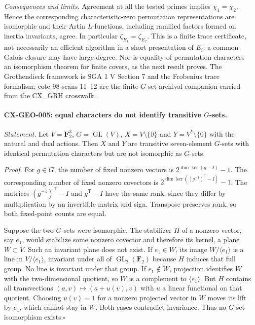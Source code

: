 \documentclass[11pt,a4paper]{article}
\begin{document}
\emph{Consequences and limits.} Agreement at all the tested primes implies
$\chi_1=\chi_2$. Hence the corresponding characteristic-zero permutation
representations are isomorphic and their Artin $L$-functions, including
ramified factors formed on inertia invariants, agree. In particular
$\zeta_{E_1}=\zeta_{E_2}$. This is a finite trace certificate, not necessarily
an efficient algorithm in a short presentation of $E_i$: a common Galois
closure may have large degree. Nor is equality of permutation characters
an isomorphism theorem for finite covers, as the next result proves.
The Grothendieck framework is SGA 1 V Section 7 and the Frobenius trace
formalism; cote 98 scans 11--12 are the finite-$G$-set archival companion
carried from the CX\_GRH crosswalk.

\paragraph{CX-GEO-005: equal characters do not identify transitive $G$-sets.}
\emph{Statement.} Let $V=\mathbf F_2^3$, $G=\operatorname{GL}(V)$,
$X=V\setminus\{0\}$ and $Y=V^*\setminus\{0\}$ with the natural and dual
actions. Then $X$ and $Y$ are transitive seven-element $G$-sets with identical
permutation characters but are not isomorphic as $G$-sets.

\emph{Proof.} For $g\in G$, the number of fixed nonzero vectors is
$2^{\dim\ker(g-I)}-1$. The corresponding number of fixed nonzero covectors
is $2^{\dim\ker((g^{-1})^{\mathsf T}-I)}-1$. The matrices
$(g^{-1})^{\mathsf T}-I$ and $g^{\mathsf T}-I$ have the same rank, since
they differ by multiplication by an invertible matrix and sign. Transpose
preserves rank, so both fixed-point counts are equal.

Suppose the two $G$-sets were isomorphic. The stabilizer $H$ of a nonzero
vector, say $e_1$, would stabilize some nonzero covector and therefore its
kernel, a plane $W\subset V$. Such an invariant plane does not exist.
If $e_1\in W$, its image $W/\langle e_1\rangle$ is a line in
$V/\langle e_1\rangle$, invariant under all of
$\operatorname{GL}_2(\mathbf F_2)$ because $H$ induces that full group.
No line is invariant under that group. If $e_1\notin W$, projection identifies
$W$ with the two-dimensional quotient, so $W$ is a complement to
$\langle e_1\rangle$. But $H$ contains all transvections
$(a,v)\mapsto(a+u(v),v)$ with $u$ a linear functional on that quotient.
Choosing $u(v)=1$ for a nonzero projected vector in $W$ moves its lift by
$e_1$, which cannot stay in $W$. Both cases contradict invariance.
Thus no $G$-set isomorphism exists.\hfill$\square$
\end{document}
